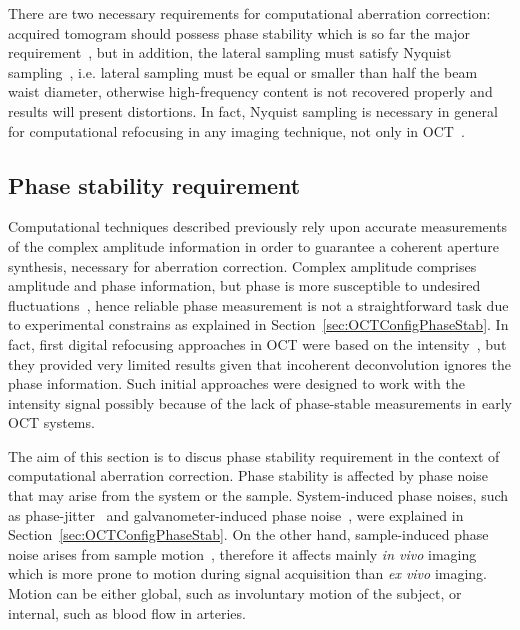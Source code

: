 There are two necessary requirements for computational aberration correction: acquired tomogram should possess phase stability which is so far the major requirement~\cite{Shemonski2014_Stability, Liu2017_Computational, South2016_Computed}, but in addition, the lateral sampling must satisfy Nyquist sampling~\cite{Liu2017_Computational}, i.e. lateral sampling must be equal or smaller than half the beam waist diameter, otherwise high-frequency content is not recovered properly and results will present distortions. In fact, Nyquist sampling is necessary in general for computational refocusing in any imaging technique, not only in OCT~\cite{Wallace2001_Workingpersons, Pawley2006_Handbook, Biggs2010_3D}. 

\FloatBarrier

\subsection{Phase stability requirement} \label{sec:phaseStab}

Computational techniques described previously rely upon accurate measurements of the complex amplitude information in order to guarantee a coherent aperture synthesis, necessary for aberration correction. Complex amplitude comprises amplitude and phase information, but phase is more susceptible to undesired fluctuations~\cite{Vakoc2005_Phaseresolved}, hence reliable phase measurement is not a straightforward task due to experimental constrains as explained in Section~\ref{sec:OCTConfigPhaseStab}. In fact, first digital refocusing approaches in OCT were based on the intensity~\cite{Ralston2005_Deconvolution, Woolliams2010_Spatially, Liu2009_Deconvolution}, but they provided very limited results given that incoherent deconvolution ignores the phase information. Such initial approaches were designed to work with the intensity signal possibly because of the lack of phase-stable measurements in early OCT systems.

The aim of this section is to discus phase stability requirement in the context of computational aberration correction. Phase stability is affected by phase noise that may arise from the system or the sample. System-induced phase noises, such as phase-jitter~\cite{Vakoc2005_Phaseresolved} and galvanometer-induced phase noise~\cite{Adie2015_Interferometric, White2003_vivo}, were explained in Section~\ref{sec:OCTConfigPhaseStab}. On the other hand, sample-induced phase noise arises from sample motion~\cite{Shemonski2014_Stability-1}, therefore it affects mainly \textit{in vivo} imaging which is more prone to motion during signal acquisition than \textit{ex vivo} imaging. Motion can be either global, such as involuntary motion of the subject, or internal, such as blood flow in arteries.

